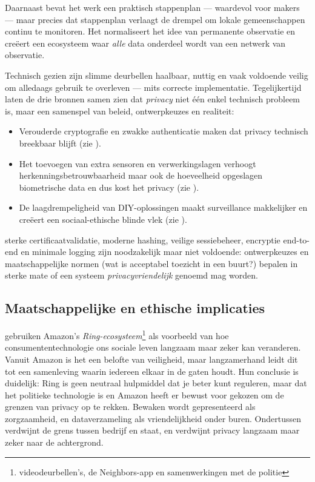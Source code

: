 \documentclass[nonacm, sigconf, balance=true]{acmart}
\begin{document}
    Daarnaast bevat het werk een praktisch stappenplan — waardevol voor makers — maar precies dat stappenplan verlaagt de drempel om lokale gemeenschappen continu te monitoren.
    Het normaliseert het idee van permanente observatie en creëert een ecosysteem waar \emph{alle} data onderdeel wordt van een netwerk van observatie.

    Technisch gezien zijn slimme deurbellen haalbaar, nuttig en vaak voldoende veilig om alledaags gebruik te overleven — mits correcte implementatie.
    Tegelijkertijd laten de drie bronnen samen zien dat \emph{privacy} niet één enkel technisch probleem is, maar een samenspel van beleid, ontwerpkeuzes en realiteit:

    \begin{itemize}
        \item Verouderde cryptografie en zwakke authenticatie maken dat privacy technisch breekbaar blijft (zie \parencite{liu2021ethical}).
        \item Het toevoegen van extra sensoren en verwerkingslagen verhoogt herkenningsbetrouwbaarheid maar ook de hoeveelheid opgeslagen biometrische data en dus kost het privacy (zie \parencite{chaudhari2020smart}).
        \item De laagdrempeligheid van DIY-oplossingen maakt surveillance makkelijker en creëert een sociaal-ethische blinde vlek (zie \parencite{lalitha2019smart}).
    \end{itemize}

    sterke certificaatvalidatie, moderne hashing, veilige sessiebeheer, encryptie end-to-end en minimale logging zijn noodzakelijk maar niet voldoende: ontwerpkeuzes en maatschappelijke normen (wat is acceptabel toezicht in een buurt?) bepalen in sterke mate of een systeem \emph{privacyvriendelijk} genoemd mag worden.

    \subsection{Maatschappelijke en ethische implicaties}\label{subsec:maatschappelijke-en-ethische-implicaties}

    \parencite{selinger2022amazon} gebruiken Amazon's \textit{Ring-ecosysteem}\footnote{videodeurbellen's, de Neighbors-app en samenwerkingen met de politie} als voorbeeld van hoe consumententechnologie ons sociale leven langzaam maar zeker kan veranderen.
    Vanuit Amazon is het een belofte van veiligheid, maar langzamerhand leidt dit tot een samenleving waarin iedereen elkaar in de gaten houdt.
    Hun conclusie is duidelijk: Ring is geen neutraal hulpmiddel dat je beter kunt reguleren, maar dat het politieke technologie is en Amazon heeft er bewust voor gekozen om de grenzen van privacy op te rekken.
    Bewaken wordt gepresenteerd als zorgzaamheid, en dataverzameling als vriendelijkheid onder buren.
    Ondertussen verdwijnt de grens tussen bedrijf en staat, en verdwijnt privacy langzaam maar zeker naar de achtergrond.
\end{document}
